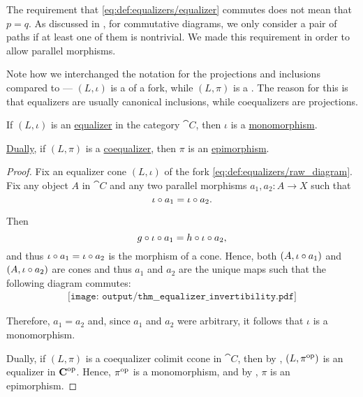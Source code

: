 \begin{definition}
  The requirement that \eqref{eq:def:equalizers/equalizer} commutes does not mean that \( p = q \). As discussed in , for commutative diagrams, we only consider a pair of paths if at least one of them is nontrivial. We made this requirement in order to allow parallel morphisms.

  Note how we interchanged the notation for the projections and inclusions compared to  --- \( (L, \iota) \) is a  of a fork, while \( (L, \pi) \) is a . The reason for this is that equalizers are usually canonical inclusions, while coequalizers are projections.
\end{definition}

\begin{proposition}\label{thm:equalizer_invertibility}
  If \( (L, \iota) \) is an \hyperref[def:equalizers]{equalizer} in the category \( \cat{C} \), then \( \iota \) is a \hyperref[def:morphism_invertibility/left_cancellative]{monomorphism}.

  \hyperref[thm:categorical_principle_of_duality]{Dually}, if \( (L, \pi) \) is a \hyperref[def:equalizers]{coequalizer}, then \( \pi \) is an \hyperref[def:morphism_invertibility/right_cancellative]{epimorphism}.
\end{proposition}
\begin{proof}
  Fix an equalizer cone \( (L, \iota) \) of the fork \eqref{eq:def:equalizers/raw_diagram}. Fix any object \( A \) in \( \cat{C} \) and any two parallel morphisms \( a_1, a_2: A \to X \) such that
  \begin{equation*}
    \iota \bincirc a_1 = \iota \bincirc a_2.
  \end{equation*}

  Then
  \begin{equation*}
    g \bincirc \iota \bincirc a_1 = h \bincirc \iota \bincirc a_2,
  \end{equation*}
  and thus \( \iota \bincirc a_1 = \iota \bincirc a_2 \) is the morphism of a cone. Hence, both \( (A, \iota \bincirc a_1) \) and \( (A, \iota \bincirc a_2) \) are cones and thus \( a_1 \) and \( a_2 \) are the unique maps such that the following diagram commutes:
  \begin{equation}\label{eq:thm:equalizer_invertibility/monomorphism}
    \begin{aligned}
      \texttt{[image: output/thm\_\_equalizer\_invertibility.pdf]}
    \end{aligned}
  \end{equation}

  Therefore, \( a_1 = a_2 \) and, since \( a_1 \) and \( a_2 \) were arbitrary, it follows that \( \iota \) is a monomorphism.

  Dually, if \( (L, \pi) \) is a coequalizer colimit ccone in \( \cat{C} \), then by , \( (L, \pi^{\operatorname{op}}) \) is an equalizer in \( \operatorname{\mathbf{C}}^{\operatorname{op}} \). Hence, \( \pi^{\operatorname{op}} \) is a monomorphism, and by , \( \pi \) is an epimorphism.
\end{proof}

